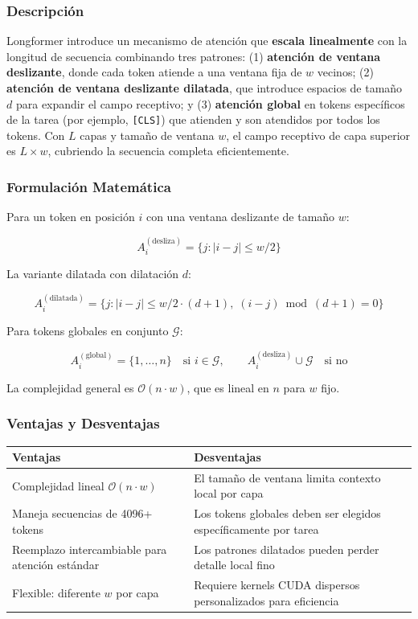 \documentclass[11pt,a4paper]{article}
\begin{document}
\subsubsection{Descripción}

Longformer introduce un mecanismo de atención que \textbf{escala linealmente} con la longitud de secuencia combinando tres patrones: (1) \textbf{atención de ventana deslizante}, donde cada token atiende a una ventana fija de $w$ vecinos; (2) \textbf{atención de ventana deslizante dilatada}, que introduce espacios de tamaño $d$ para expandir el campo receptivo; y (3) \textbf{atención global} en tokens específicos de la tarea (por ejemplo, \texttt{[CLS]}) que atienden y son atendidos por todos los tokens. Con $L$ capas y tamaño de ventana $w$, el campo receptivo de capa superior es $L \times w$, cubriendo la secuencia completa eficientemente.

\subsubsection{Formulación Matemática}

Para un token en posición $i$ con una ventana deslizante de tamaño $w$:

$$
A_i^{(\text{desliza})} = \{j : |i - j| \leq w/2\}
$$

La variante dilatada con dilatación $d$:

$$
A_i^{(\text{dilatada})} = \{j : |i - j| \leq w/2 \cdot (d + 1),\; (i - j) \bmod (d+1) = 0 \}
$$

Para tokens globales en conjunto $\mathcal{G}$:

$$
A_i^{(\text{global})} = \{1, \ldots, n\} \quad \text{si } i \in \mathcal{G}, \qquad A_i^{(\text{desliza})} \cup \mathcal{G} \quad \text{si no}
$$

La complejidad general es $\mathcal{O}(n \cdot w)$, que es lineal en $n$ para $w$ fijo.

\subsubsection{Ventajas y Desventajas}

\begin{tabular}{|p{4cm}|p{4cm}|}
\hline
\textbf{Ventajas} & \textbf{Desventajas} \\
\hline
Complejidad lineal $\mathcal{O}(n \cdot w)$ & El tamaño de ventana limita contexto local por capa \\
Maneja secuencias de 4096+ tokens & Los tokens globales deben ser elegidos específicamente por tarea \\
Reemplazo intercambiable para atención estándar & Los patrones dilatados pueden perder detalle local fino \\
Flexible: diferente $w$ por capa & Requiere kernels CUDA dispersos personalizados para eficiencia \\
\hline
\end{tabular}
\end{document}
